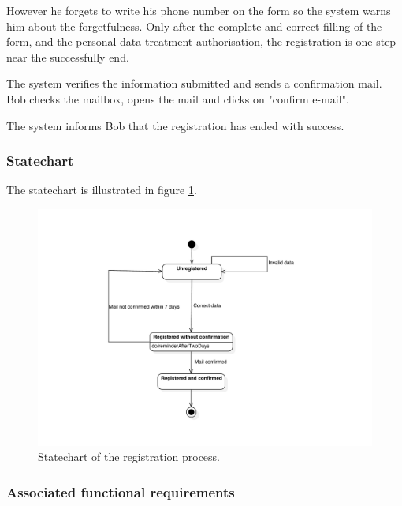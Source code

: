 However he forgets to write his phone number on the form so the system warns him about the forgetfulness.
Only after the complete and correct filling of the form, and the personal data treatment authorisation, the registration is one step near the successfully end.

The system verifies the information submitted and sends a confirmation mail.
Bob checks the mailbox, opens the mail and clicks on "confirm e-mail".

The system informs Bob that the registration has ended with success.

\subsubsection{Statechart}
The statechart is illustrated in figure \ref{fig:statechart-registration}.
\begin{figure}
\includegraphics[width=\textwidth]{diagrams/statechart_registration.pdf}
\caption{Statechart of the registration process.}
\label{fig:statechart-registration}
\end{figure}

\subsubsection{Associated functional requirements}

